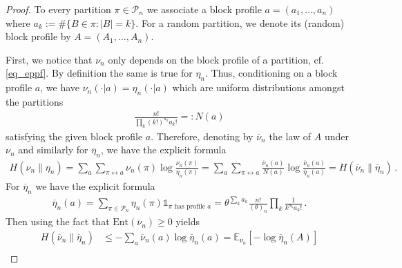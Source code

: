 \documentclass[a4paper,11pt]{article}
\newcommand{\EE}{\mathbb{E}}
\newcommand{\mP}{\mathcal{P}}
\numberwithin{equation}{section}
\begin{document}
\begin{proof}
To every partition $\pi\in\mathcal P_n$ we associate a block profile
$a=(a_1,\ldots,a_n)$ where $a_k:=\#\{B\in\pi:|B|=k\}$.
For a random partition, we denote its (random) block profile by $A=(A_1,\ldots,A_n)$.

First, we notice that $ \nu_{n}$ only depends on the block profile of a partition, cf. \eqref{eq_eppf}. 
By definition the same is true for $ \eta_{n}$. Thus, conditioning on a block profile $ a$, we have $ \nu_n ( \cdot |a)= \eta_{n}( \cdot | a)$ which are uniform distributions amongst the partitions 
\begin{equation*}
\begin{aligned}
\frac{n!}{\prod_{k} (k!)^{a_{k}} a_{k}!} =:N(a)
\end{aligned}
\end{equation*}
satisfying the given block profile $a$.
 Therefore, denoting by $\overline\nu_n$ the law of $ A$ under $ \nu_{n}$ and similarly for $ \overline{\eta}_{n}$, we have the explicit formula 
\begin{equation*}
\begin{aligned}
H ( \nu_{n}\| \eta_{n}) 
=
\sum_{a} \sum_{\pi \leftrightarrow a} \nu_{n}(\pi) \log{ \frac{\nu_{n}( \pi)}{\eta_{n}(\pi)} } 
=
\sum_{a} \sum_{\pi \leftrightarrow a} \frac{\overline{\nu}_{n}(a)}{N(a)} \log{ \frac{ \overline{\nu}_{n}( a)}{ \overline{\eta}_{n}(a)} } 
=
H ( \overline{\nu}_{n}\| \overline{\eta}_{n}) \,.
\end{aligned}
\end{equation*}
For $ \overline{\eta}_{n}$ we have the explicit formula 
\begin{equation*}
\begin{aligned}
\overline{\eta}_{n}(a) = \sum_{\pi \in \mP_{n}}\eta_{n}( \pi) \mathds{1}_{\pi \text{ has profile } a} 
=
\theta^{\sum_{k} a_{k}}
\frac{n!}{( \theta)_{n}} 
\prod_{k} \frac{1}{k^{a_k}a_k!}\,.
\end{aligned}
\end{equation*}
Then using the fact that $ \mathrm{Ent}( \overline{\nu}_{n}) \geqslant  0$ yields
\begin{equation*}
\begin{aligned}
H ( \overline{\nu}_{n}\| \overline{\eta}_{n})
& \leqslant -\sum_{a} \overline{\nu}_{n}( a) 
 \log{ \overline{\eta}_{n}( a)} 
 = \EE_{\nu_{n}}[ - \log{ \overline{\eta}_{n}(A)} ]\\

\end{aligned}
\end{equation*}
\end{proof}
\end{document}
